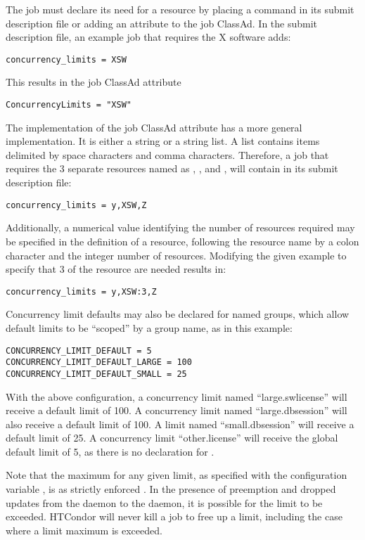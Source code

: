 The job must declare its need for a resource by placing a command
in its submit description file or adding an attribute to the
job ClassAd.
In the submit description file, an example job that requires
the X software adds:
\begin{verbatim}
concurrency_limits = XSW
\end{verbatim}
This results in the job ClassAd attribute
\begin{verbatim}
ConcurrencyLimits = "XSW"
\end{verbatim}

The implementation of the job ClassAd attribute 
has a more general implementation.
It is either a string or a string list.
A list contains items delimited by space characters and comma characters.
Therefore, a job that requires the 3 separate resources 
named as  , , and  , 
will contain in its submit description file:
\begin{verbatim}
concurrency_limits = y,XSW,Z
\end{verbatim}

Additionally, a numerical value identifying the number of resources
required may be specified in the definition of a resource,
following the resource name by a colon character and the integer
number of resources.
Modifying the given example to specify that 3 of 
the  resource are needed results in: 
\begin{verbatim}
concurrency_limits = y,XSW:3,Z
\end{verbatim}

Concurrency limit defaults may also be declared for named groups, which
allow default limits to be ``scoped'' by a group name, as in this example:
\begin{verbatim}
CONCURRENCY_LIMIT_DEFAULT = 5
CONCURRENCY_LIMIT_DEFAULT_LARGE = 100
CONCURRENCY_LIMIT_DEFAULT_SMALL = 25
\end{verbatim}

With the above configuration, a concurrency limit named ``large.swlicense'' 
will receive a default limit of 100.  A concurrency limit named
``large.dbsession'' will also receive a default limit of 100.  A limit named
``small.dbsession'' will receive a default limit of 25.  A concurrency limit 
``other.license'' will receive the global default limit of 5, as there is
no declaration for .

Note that the maximum for any given limit,
as specified with the configuration variable ,
is as strictly enforced .
In the presence of preemption and dropped updates from
the  daemon to the  daemon,
it is possible for the limit to be exceeded.
HTCondor will never kill a job to free up a limit,
including the case where a limit maximum is exceeded. 

